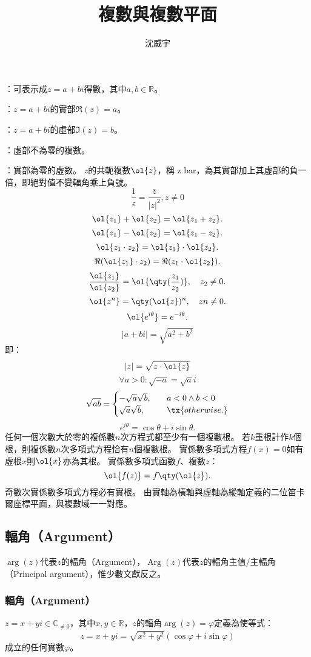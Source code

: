 \documentclass[a4paper,12pt]{article}
\begin{document}
\title{複數與複數平面}
\author{沈威宇}
\date{\temtoday}
\titletocdoc
{}
\bit
\item {}：可表示成$z=a+bi$得數，其中$a,b\in\mathbb{R}$。
\item {}：$z=a+bi$的實部$\Re(z)=a$。
\item {}：$z=a+bi$的虛部$\Im(z)=b$。
\item {}：虛部不為零的複數。
\item {}：實部為零的虛數。
\eit
{}
$z$的共軛複數$\ol{z}$，稱 z bar，為其實部加上其虛部的負一倍，即絕對值不變輻角乘上負號。
\[\frac{1}{z}=\frac{\bar{z}}{|z|^2},z\neq 0\]
\[\ol{z_1}+\ol{z_2}=\ol{z_1+z_2}.\]
\[\ol{z_1}-\ol{z_2}=\ol{z_1-z_2}.\]
\[\ol{z_1\cdot z_2}=\ol{z_1}\cdot\ol{z_2}.\]
\[\Re(\ol{z_1}\cdot z_2)=\Re(z_1\cdot\ol{z_2}).\]
\[\frac{\ol{z_1}}{\ol{z_2}}=\ol{\qty(\frac{z_1}{z_2})},\quad z_2\neq 0.\]
\[\ol{z^n}=\qty(\ol{z})^n,\quad zn\neq 0.\]
\[\ol{e^{i\theta}}=e^{-i\theta}.\]
\[|a+bi|=\sqrt{a^2+b^2}\]
即：
\[|z|=\sqrt{z\cdot\ol{z}}\]
\[\forall a>0\colon\sqrt{-a}=\sqrt{a}i\]
\[\sqrt{ab}=\begin{cases}
-\sqrt{a}\sqrt{b},\quad &a<0\land b<0\\
\sqrt{a}\sqrt{b},\quad &\tx{otherwise.}
\end{cases}\]
\[e^{i\theta}=\cos\theta+i\sin\theta.\]
任何一個次數大於零的複係數$n$次方程式都至少有一個複數根。
若$k$重根計作$k$個根，則複係數$n$次多項式方程恰有$n$個複數根。
實係數多項式方程$f(x)=0$如有虛根$x$則$\ol{x}$亦為其根。
實係數多項式函數$f$、複數$z$：
\[\ol{f(z)}=f\qty(\ol{z}).\]
奇數次實係數多項式方程必有實根。
由實軸為橫軸與虛軸為縱軸定義的二位笛卡爾座標平面，與複數域一一對應。
\subsection{輻角（Argument）}
$\arg(z)$代表$z$的輻角（Argument），$\operatorname{Arg}(z)$代表$z$的輻角主值/主輻角（Principal argument），惟少數文獻反之。
\subsubsection{輻角（Argument）}
$z=x+yi\in\mathbb {C}_{\neq 0}$，其中$x,y\in\mathbb{R}$，$z$的輻角$\arg(z)=\varphi$定義為使等式：
\[z=x+yi=\sqrt{x^2+y^2}(\cos \varphi +i\sin \varphi )\]
成立的任何實數$\varphi $。
\end{document}
